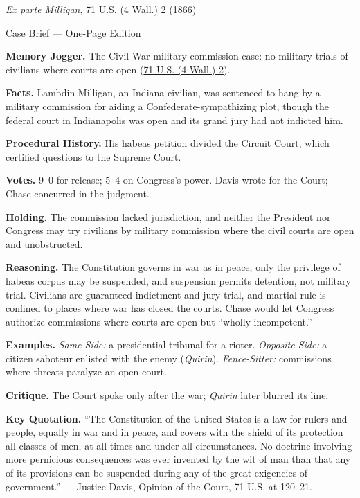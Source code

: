 \documentclass[12pt]{article}
\begin{document}
\begin{center}
{\Large \textit{Ex parte Milligan}, 71 U.S. (4 Wall.) 2 (1866)\par}
\vspace{0.3em}
{\normalsize Case Brief --- One-Page Edition\par}
\end{center}

\textbf{Memory Jogger.} The Civil War military-commission case: no military trials of civilians where courts are open (\href{https://supreme.justia.com/cases/federal/us/71/2/}{71 U.S. (4 Wall.) 2}).

\textbf{Facts.} Lambdin Milligan, an Indiana civilian, was sentenced to hang by a military commission for aiding a Confederate-sympathizing plot, though the federal court in Indianapolis was open and its grand jury had not indicted him.

\textbf{Procedural History.} His habeas petition divided the Circuit Court, which certified questions to the Supreme Court.

\textbf{Votes.} 9--0 for release; 5--4 on Congress's power. Davis wrote for the Court; Chase concurred in the judgment.

\textbf{Holding.} The commission lacked jurisdiction, and neither the President nor Congress may try civilians by military commission where the civil courts are open and unobstructed.

\textbf{Reasoning.} The Constitution governs in war as in peace; only the privilege of habeas corpus may be suspended, and suspension permits detention, not military trial. Civilians are guaranteed indictment and jury trial, and martial rule is confined to places where war has closed the courts. Chase would let Congress authorize commissions where courts are open but ``wholly incompetent.''

\textbf{Examples.} \emph{Same-Side:} a presidential tribunal for a rioter. \emph{Opposite-Side:} a citizen saboteur enlisted with the enemy (\textit{Quirin}). \emph{Fence-Sitter:} commissions where threats paralyze an open court.

\textbf{Critique.} The Court spoke only after the war; \textit{Quirin} later blurred its line.

\textbf{Key Quotation.} ``The Constitution of the United States is a law for rulers and people, equally in war and in peace, and covers with the shield of its protection all classes of men, at all times and under all circumstances. No doctrine involving more pernicious consequences was ever invented by the wit of man than that any of its provisions can be suspended during any of the great exigencies of government.'' --- Justice Davis, Opinion of the Court, 71 U.S. at 120--21.
\end{document}
